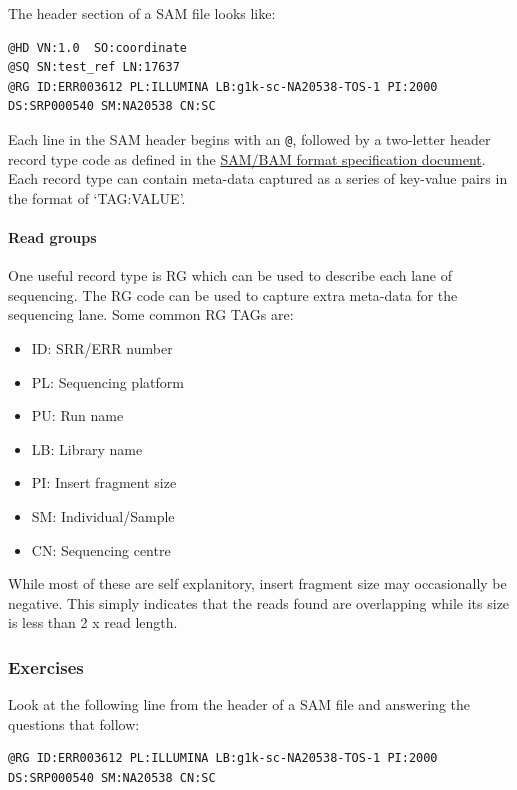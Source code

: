 \documentclass[11pt]{article}
\providecommand{\tightlist}{%
      \setlength{\itemsep}{0pt}\setlength{\parskip}{0pt}}
\begin{document}
The header section of a SAM file looks like:

\begin{verbatim}
@HD VN:1.0  SO:coordinate
@SQ SN:test_ref LN:17637
@RG ID:ERR003612 PL:ILLUMINA LB:g1k-sc-NA20538-TOS-1 PI:2000 DS:SRP000540 SM:NA20538 CN:SC
\end{verbatim}

Each line in the SAM header begins with an \texttt{@}, followed by a
two-letter header record type code as defined in the
\href{https://samtools.github.io/hts-specs/SAMv1.pdf}{SAM/BAM format
specification document}. Each record type can contain meta-data captured
as a series of key-value pairs in the format of `TAG:VALUE'.

\hypertarget{read-groups}{%
\paragraph{Read groups}\label{read-groups}}

One useful record type is RG which can be used to describe each lane of
sequencing. The RG code can be used to capture extra meta-data for the
sequencing lane. Some common RG TAGs are:

\begin{itemize}
\tightlist
\item
  ID: SRR/ERR number
\item
  PL: Sequencing platform
\item
  PU: Run name
\item
  LB: Library name
\item
  PI: Insert fragment size
\item
  SM: Individual/Sample
\item
  CN: Sequencing centre
\end{itemize}

While most of these are self explanitory, insert fragment size may
occasionally be negative. This simply indicates that the reads found are
overlapping while its size is less than 2 x read length.

    \hypertarget{exercises}{%
\subsubsection{Exercises}\label{exercises}}

Look at the following line from the header of a SAM file and answering
the questions that follow:

\begin{verbatim}
@RG ID:ERR003612 PL:ILLUMINA LB:g1k-sc-NA20538-TOS-1 PI:2000 DS:SRP000540 SM:NA20538 CN:SC
\end{verbatim}
\end{document}

